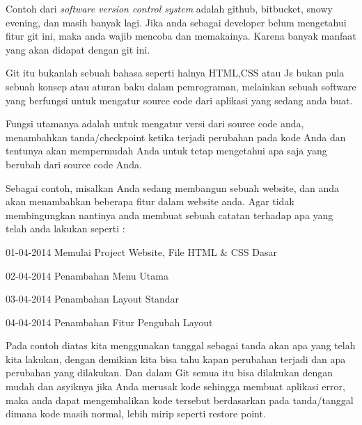  \par
 \vspace{\baselineskip}
\noindent 
Contoh dari $  $\textit{software version control system} $  $adalah github, bitbucket, snowy evening, dan masih banyak lagi. Jika anda sebagai developer belum mengetahui fitur git ini, maka anda wajib mencoba dan memakainya. Karena banyak manfaat yang akan didapat dengan git ini. \par
\vspace{\baselineskip}
\noindent 
Git itu bukanlah sebuah bahasa seperti halnya HTML,CSS atau Js bukan pula sebuah konsep atau aturan baku dalam pemrograman, melainkan sebuah software yang berfungsi untuk mengatur source code dari aplikasi yang sedang anda buat. \par
\noindent 
Fungsi utamanya adalah untuk mengatur versi dari source code anda, menambahkan tanda/checkpoint ketika terjadi perubahan pada kode Anda dan tentunya akan mempermudah Anda untuk tetap mengetahui apa saja yang berubah dari source code Anda. \par
\vspace{\baselineskip}
\noindent 
Sebagai contoh, misalkan Anda sedang membangun sebuah website, dan anda akan menambahkan beberapa fitur dalam website anda. Agar tidak membingungkan nantinya anda membuat sebuah catatan terhadap apa yang telah anda lakukan seperti : \par
\noindent 
 \hspace*{0.5in} 01-04-2014 Memulai Project Website, File HTML  $  \&  $ CSS Dasar \par
\noindent 
 \hspace*{0.5in} 02-04-2014 Penambahan Menu Utama \par
\noindent 
 \hspace*{0.5in} 03-04-2014 Penambahan Layout Standar \par
\noindent 
 \hspace*{0.5in} 04-04-2014 Penambahan Fitur Pengubah Layout \par
 \vspace{\baselineskip}
\noindent 
 \hspace*{0.5in} Pada contoh diatas kita menggunakan tanggal sebagai tanda akan apa yang telah kita lakukan, dengan demikian kita bisa tahu kapan perubahan terjadi dan apa perubahan yang dilakukan. Dan dalam Git semua itu bisa dilakukan dengan mudah dan asyiknya jika Anda merusak kode sehingga membuat aplikasi error, maka anda dapat mengembalikan kode tersebut berdasarkan pada tanda/tanggal dimana kode masih normal, lebih mirip seperti restore point. \par
